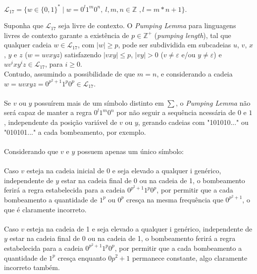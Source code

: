 \documentclass[12pt]{article}
\def\discente{Rafael Nunes Moreira Costa}
\def\matricula{202107855}
\def\myling{{17}} %
\begin{document}
%
\begin{tcolorbox}[rounded corners, colback=yellow!5, colframe=red!40!black, title={\discente\ (\matricula)}]
 $\mathcal{L}_{\myling} = \{w\in\{0,1\}^*\mid w = 0^l1^m0^n,\ l, m, n \in\mathbb{Z}$ $, l = m*n +1\}$.
\end{tcolorbox}
\begin{tcolorbox}[rounded corners, breakable, colback=yellow!5, colframe=red!40!black, title={A linguagem $\mathcal{L}_{\myling}$ não é livre de contexto.}]
Suponha que $\mathcal{L}_{\myling}$ seja livre de contexto. O \emph{Pumping Lemma} para linguagens livres de contexto garante a existência de $p\in\mathbb{Z}^+$ (\emph{pumping length}), tal que qualquer cadeia $w\in \mathcal{L}_{\myling}$, com $|w|\geqslant p$, pode ser subdividida em subcadeias $u$, $v$, $x$, $y$ e $z$ ($w=uvxyz$) satisfazendo $|vxy|\leqslant p$, $|vy|>0$ ($v\neq\varepsilon$ e/ou $y\neq\varepsilon$) e $uv^ixy^iz\in \mathcal{L}_{\myling}$, para $i\geqslant 0$.\\[10pt]
Contudo, assumindo a possibilidade de que $m=n$, e considerando a cadeia $w=uvxyz=0^{p^2+1}1^p0^p\in \mathcal{L}_{\myling}$. 
\\
\\
Se $v$ ou $y$ possuírem mais de um símbolo distinto em $\sum$, o \emph{Pumping Lemma} não será capaz de manter a regra $0^l1^m0^n$ por não seguir a sequência ncessária de $0$ e $1$, independente da posição variável de $v$ ou $y$, gerando cadeias com "101010..." ou "010101..." a cada bombeamento, por exemplo.
\\
\\
Considerando que $v$ e $y$ possuem apenas um único símbolo:
\\
\\
Caso $v$ esteja na cadeia inicial de 0 e seja elevado a qualquer i genérico, independente de $y$ estar na cadeia final de 0 ou na cadeia de 1, o bombeamento ferirá a regra estabelecida para a cadeia $0^{p^2+1}1^p0^p$, por permitir que a cada bombeamento a quantidade de $1^p$ ou $0^p$ cresça na mesma frequência que $0^{p^2+1}$, o que é claramente incorreto.
\\
\\
Caso $v$ esteja na cadeia de 1 e seja elevado a qualquer i genérico, independente de $y$ estar na cadeia final de 0 ou na cadeia de 1, o bombeamento ferirá a regra estabelecida para a cadeia $0^{p^2+1}1^p0^p$, por permitir que a cada bombeamento a quantidade de $1^p$ cresça enquanto $0{p^2+1}$ permanece constante, algo claramente incorreto também.

\end{tcolorbox}
\end{document}
